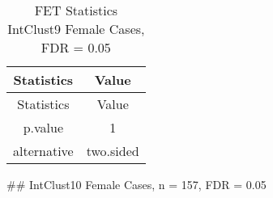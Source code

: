 \documentclass[]{article}
\begin{document}
\begin{longtable}[]{@{}cc@{}}
\caption{FET Statistics IntClust9 Female Cases, FDR =
0.05}\tabularnewline
\toprule
\begin{minipage}[b]{0.18\columnwidth}\centering\strut
Statistics\strut
\end{minipage} & \begin{minipage}[b]{0.14\columnwidth}\centering\strut
Value\strut
\end{minipage}\tabularnewline
\midrule
\endfirsthead
\toprule
\begin{minipage}[b]{0.18\columnwidth}\centering\strut
Statistics\strut
\end{minipage} & \begin{minipage}[b]{0.14\columnwidth}\centering\strut
Value\strut
\end{minipage}\tabularnewline
\midrule
\endhead
\begin{minipage}[t]{0.18\columnwidth}\centering\strut
p.value\strut
\end{minipage} & \begin{minipage}[t]{0.14\columnwidth}\centering\strut
1\strut
\end{minipage}\tabularnewline
\begin{minipage}[t]{0.18\columnwidth}\centering\strut
alternative\strut
\end{minipage} & \begin{minipage}[t]{0.14\columnwidth}\centering\strut
two.sided\strut
\end{minipage}\tabularnewline
\bottomrule
\end{longtable}

\pagebreak
\#\# IntClust10 Female Cases, n = 157, FDR = 0.05
\end{document}
